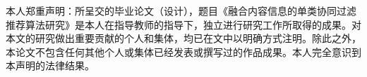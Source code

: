 \newpage

\centerline{\heiti{}}


\vskip 3cm 

本人郑重声明：所呈交的毕业论文（设计），题目《融合内容信息的单类协同过滤推荐算法研究》是本人在指导教师的指导下，独立进行研究工作所取得的成果。对本文的研究做出重要贡献的个人和集体，均已在文中以明确方式注明。除此之外，本论文不包含任何其他个人或集体已经发表或撰写过的作品成果。本人完全意识到本声明的法律结果。

\vskip 3cm

{}
